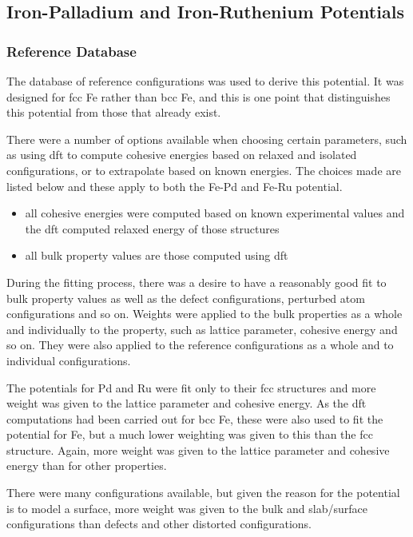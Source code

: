 \FloatBarrier
\subsection{Iron-Palladium and Iron-Ruthenium Potentials}
\label{section:fepdpotentialresult}

\subsubsection{Reference Database}

The database of reference configurations was used to derive this potential.  It was designed for \acrshort{fcc} Fe rather than \acrshort{bcc} Fe, and this is one point that distinguishes this potential from those that already exist.

There were a number of options available when choosing certain parameters, such as using \acrshort{dft} to compute cohesive energies based on relaxed and isolated configurations, or to extrapolate based on known energies.  The choices made are listed below and these apply to both the Fe-Pd and Fe-Ru potential.

\begin{itemize}
\item all cohesive energies were computed based on known experimental values and the \acrshort{dft} computed relaxed energy of those structures
\item all bulk property values are those computed using \acrshort{dft}
\end{itemize}

During the fitting process, there was a desire to have a reasonably good fit to bulk property values as well as the defect configurations, perturbed atom configurations and so on.  Weights were applied to the bulk properties as a whole and individually to the property, such as lattice parameter, cohesive energy and so on.  They were also applied to the reference configurations as a whole and to individual configurations.

The potentials for Pd and Ru were fit only to their \acrshort{fcc} structures and more weight was given to the lattice parameter and cohesive energy.  As the \acrshort{dft} computations had been carried out for \acrshort{bcc} Fe, these were also used to fit the potential for Fe, but a much lower weighting was given to this than the \acrshort{fcc} structure.  Again, more weight was given to the lattice parameter and cohesive energy than for other properties.

There were many configurations available, but given the reason for the potential is to model a surface, more weight was given to the bulk and slab/surface configurations than defects and other distorted configurations.
 
